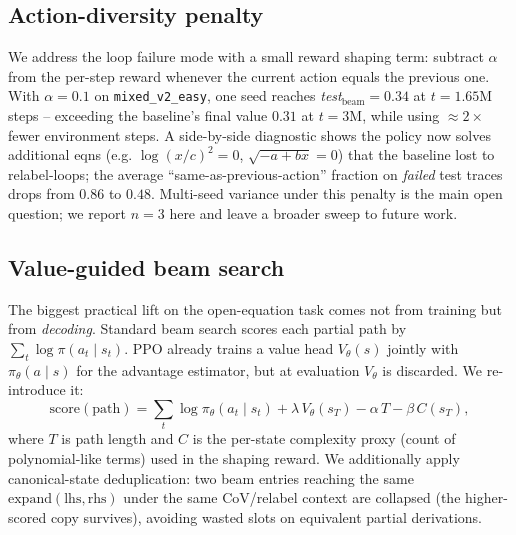\documentclass{article}
\theoremstyle{plain}
\theoremstyle{definition}
\theoremstyle{remark}
\begin{document}
\subsection{Action-diversity penalty}
\label{sec:antiloop}
We address the loop failure mode with a small reward shaping term: subtract $\alpha$ from the per-step reward whenever the current action equals the previous one. With $\alpha = 0.1$ on \texttt{mixed\_v2\_easy}, one seed reaches \textit{test}$_{\text{beam}}=0.34$ at $t=1.65\text{M}$ steps -- exceeding the baseline's final value $0.31$ at $t=3\text{M}$, while using $\approx 2\times$ fewer environment steps. A side-by-side diagnostic shows the policy now solves additional eqns (e.g. $\log(x/c)^2 = 0$, $\sqrt{-a+bx} = 0$) that the baseline lost to relabel-loops; the average ``same-as-previous-action'' fraction on \emph{failed} test traces drops from $0.86$ to $0.48$. Multi-seed variance under this penalty is the main open question; we report $n=3$ here and leave a broader sweep to future work.

\subsection{Value-guided beam search}
\label{sec:value_beam}
The biggest practical lift on the open-equation task comes not from training but from \emph{decoding}. Standard beam search scores each partial path by $\sum_t \log \pi(a_t \mid s_t)$. PPO already trains a value head $V_\theta(s)$ jointly with $\pi_\theta(a\!\mid\! s)$ for the advantage estimator, but at evaluation $V_\theta$ is discarded. We re-introduce it:
\begin{equation}
\label{eq:value_beam}
\text{score}(\text{path}) = \sum_t \log \pi_\theta(a_t \mid s_t) + \lambda\, V_\theta(s_T) - \alpha\, T - \beta\, C(s_T),
\end{equation}
where $T$ is path length and $C$ is the per-state complexity proxy (count of polynomial-like terms) used in the shaping reward. We additionally apply canonical-state deduplication: two beam entries reaching the same $\text{expand}(\text{lhs}, \text{rhs})$ under the same CoV/relabel context are collapsed (the higher-scored copy survives), avoiding wasted slots on equivalent partial derivations.
\end{document}
